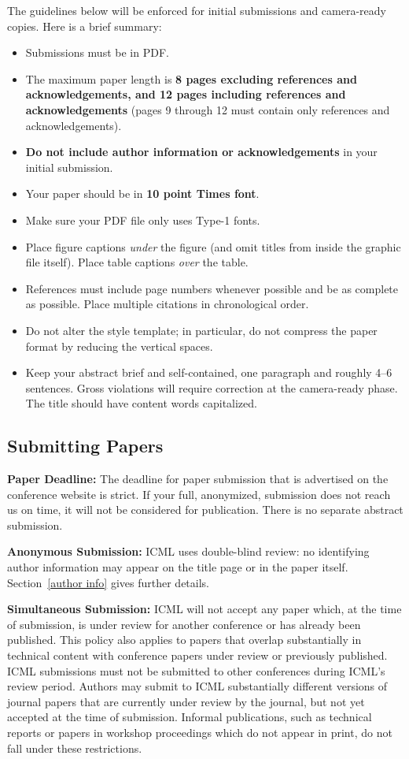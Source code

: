\documentclass{article}
\begin{document}
The guidelines below will be enforced for initial submissions and
camera-ready copies. Here is a brief summary:
\begin{itemize}
\item Submissions must be in PDF\@.
\item The maximum paper length is \textbf{8 pages excluding references and
    acknowledgements, and 12 pages including references and acknowledgements}
    (pages 9 through 12 must contain only references and acknowledgements).
\item \textbf{Do not include author information or acknowledgements} in your
    initial submission.
\item Your paper should be in \textbf{10 point Times font}.
\item Make sure your PDF file only uses Type-1 fonts.
\item Place figure captions \emph{under} the figure (and omit titles from inside
    the graphic file itself). Place table captions \emph{over} the table.
\item References must include page numbers whenever possible and be as complete
    as possible. Place multiple citations in chronological order.
\item Do not alter the style template; in particular, do not compress the paper
    format by reducing the vertical spaces.
\item Keep your abstract brief and self-contained, one paragraph and roughly
    4--6 sentences. Gross violations will require correction at the
    camera-ready phase. The title should have content words capitalized.
\end{itemize}

\subsection{Submitting Papers}

\textbf{Paper Deadline:} The deadline for paper submission that is
advertised on the conference website is strict. If your full,
anonymized, submission does not reach us on time, it will not be
considered for publication. There is no separate abstract submission.

\textbf{Anonymous Submission:} ICML uses double-blind review: no identifying
author information may appear on the title page or in the paper
itself. Section~\ref{author info} gives further details.

\textbf{Simultaneous Submission:} ICML will not accept any paper which,
at the time of submission, is under review for another conference or
has already been published. This policy also applies to papers that
overlap substantially in technical content with conference papers
under review or previously published. ICML submissions must not be
submitted to other conferences during ICML's review period. Authors
may submit to ICML substantially different versions of journal papers
that are currently under review by the journal, but not yet accepted
at the time of submission. Informal publications, such as technical
reports or papers in workshop proceedings which do not appear in
print, do not fall under these restrictions.
\end{document}

